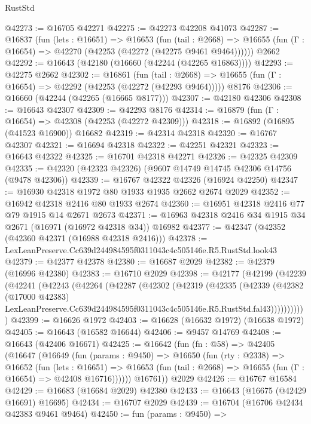 \begin{lexlean}{RustStd}
\begin{coremodule}
@42273 := @16705 @42271
@42275 := @42273 @42208 @41073
@42287 := @16837
    (fun (lets : @16651) =>
    @16653
      (fun (tail : @2668) =>
      @16655 (fun (Γ : @16654) => @42270 (@42253 (@42272 (@42275 @9461 @9464))))))
    @2662
@42292 := @16643 (@42180 (@16660 (@42244 (@42265 @16863))))
@42293 := @42275 @2662
@42302 := @16861
    (fun (tail : @2668) => @16655 (fun (Γ : @16654) => @42292 (@42253 (@42272 (@42293 @9464)))))
    @8176
@42306 := @16660 (@42244 (@42265 (@16665 @8177)))
@42307 := @42180 @42306
@42308 := @16643 @42307
@42309 := @42293 @8176
@42314 := @16879 (fun (Γ : @16654) => @42308 (@42253 (@42272 @42309)))
@42318 := @16892 (@16895 (@41523 @16900)) @16682
@42319 := @42314 @42318
@42320 := @16767 @42307
@42321 := @16694 @42318
@42322 := @42251 @42321
@42323 := @16643 @42322
@42325 := @16701 @42318 @42271
@42326 := @42325 @42309
@42335 := @42320 (@42323 @42326) (@9607 @14749 @14745 @42306 @14756 (@9478 @42306))
@42339 := @16767 @42322 @42326 (@16924 @42250)
@42347 := @16930 @42318 @1972 @80 @1933 @1935 @2662 @2674 @2029
@42352 := @16942 @42318 @2416 @80 @1933 @2674
@42360 := @16951 @42318 @2416 @77 @79 @1915 @14 @2671 @2673
@42371 := @16963 @42318 @2416 @34 @1915 @34 @2671 (@16971 (@16972 @42318 @34)) @16982
@42377 := @42347 (@42352 (@42360 @42371 (@16988 @42318 @2416)))
@42378 := LexLeanPreserve.Cc639d244984595f0311043c4c505146e.R5.RustStd.look43
@42379 := @42377 @42378
@42380 := @16687 @2029
@42382 := @42379 (@16996 @42380)
@42383 := @16710 @2029
@42398 := @42177
    (@42199
      (@42239
        (@42241
          (@42243
            (@42264
              (@42287
                (@42302
                  (@42319
                    (@42335
                      (@42339
                        (@42382
                          (@17000 @42383)
                          LexLeanPreserve.Cc639d244984595f0311043c4c505146e.R5.RustStd.fal43)))))))))))
@42399 := @16626 @1972
@42403 := @16628 (@16632 @1972) (@16638 @1972)
@42405 := @16643 (@16582 @16644)
@42406 := @9457 @14769
@42408 := @16643 (@42406 @16671)
@42425 := @16642
    (fun (fn : @58) =>
    @42405
      (@16647
        (@16649
          (fun (params : @9450) =>
          @16650
            (fun (rty : @2338) =>
            @16652
              (fun (lets : @16651) =>
              @16653 (fun (tail : @2668) => @16655 (fun (Γ : @16654) => @42408 @16716))))))
        @16761))
    @2029
@42426 := @16767 @16584
@42429 := @16683 (@16684 @2029) @42380
@42433 := @16643 (@16675 (@42429 @16691) @16695)
@42434 := @16707 @2029
@42439 := @16704 (@16706 @42434 @42383 @9461 @9464)
@42450 := fun (params : @9450) =>

\end{coremodule}
\end{lexlean}
